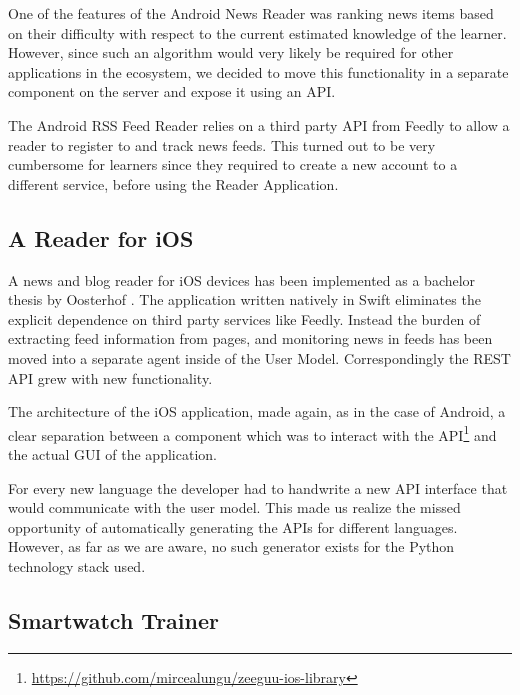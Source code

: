 One of the features of the Android News Reader was ranking news items based on their difficulty with respect to the current estimated knowledge of the learner. However, since such an algorithm would very likely be required for other applications in the ecosystem, we decided to move this functionality in a separate component on the server and expose it using an API. 


The Android RSS Feed Reader relies on a third party API from Feedly to allow a reader to register to and track news feeds. This turned out to be very cumbersome for learners since they required to create a new account to a different service, before using the Reader Application.


\subsection {A Reader for iOS}

A news and blog reader for iOS devices has been implemented as a bachelor thesis by Oosterhof \cite{Oost16reading}. The application written natively in Swift eliminates the explicit dependence on third party services like Feedly. Instead the burden of extracting feed information from pages, and monitoring news in feeds has been moved into a separate agent inside of the User Model. Correspondingly the REST API grew with new functionality.

The architecture of the iOS application, made again, as in the case of Android, a clear separation between a component which was to interact with the API\footnote{\url{https://github.com/mircealungu/zeeguu-ios-library}} and the actual GUI of the application. 

For every new language the developer had to handwrite a new API interface that would communicate with the user model. This made us realize the missed opportunity of automatically generating the APIs for different languages. However, as far as we are aware, no such generator exists for the Python technology stack used. 



\subsection {Smartwatch Trainer}

